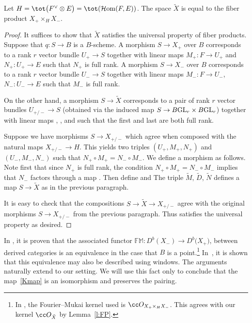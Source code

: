 \begin{Lemma}\label{l:FP} Let $H = \tot\bigl(F^\vee \otimes E\bigr) = \tot( \mathcal{H}{\rm om}(F, E) )$.
 The space $\tilde X$ is equal to the fiber product
 $X_+ \times_H X_-.$
\end{Lemma}
\begin{proof}
 It suffices to show that $\tilde X$ satisfies the universal property of fiber products. Suppose that $q\colon S \to B$ is a $B$-scheme. A morphism $S \to X_+$ over $B$ corresponds to a rank $r$ vector bundle $U_+ \to S$ together with linear maps $M_+\colon F \to U_+$ and $N_+\colon U_+ \to E$ such that $N_+$ is full rank. A morphism $S \to X_-$ over $B$ corresponds to a rank $r$ vector bundle $U_- \to S$ together with linear maps $M_-\colon F \to U_-$, $N_-\colon U_- \to E$ such that $M_-$ is full rank.

 On the other hand, a morphism $S \to \tilde X$ corresponds to a pair of rank $r$ vector bundles $U_{+/-} \to S$ (obtained via the induced map $S \to B{\rm GL}_r \times B{\rm GL}_r$) together with linear maps
 , , and  such that the first and last are both full rank.

 Suppose we have morphisms $S \to X_{+/-}$ which agree when composed with the natural maps $X_{+/-} \to H$.
 This yields two triples $(U_+, M_+, N_+)$ and $(U_-, M_-, N_-)$ such that $N_+ \circ M_+ = N_- \circ M_-$.
 We define a morphism  as follows.
 Note first that since $N_+$ is full rank, the condition $N_+ \circ M_+ = N_- \circ M_-$ implies that $N_-$ factors through a map . Then define  and  The triple $\tilde M$, $\tilde D$, $\tilde N$ defines a map $S \to \tilde X$ as in the previous paragraph.

It is easy to check that the compositions $S \to \tilde X \to X_{+/-}$ agree with the original morphisms $S \to X_{+/-}$ from the previous paragraph. Thus  satisfies the universal property as desired.
\end{proof}

In \cite[Theorem~D]{BLV}, it is proven that the
associated functor $\mathbb{FM}\colon D^b(X_-) \to D^b\bigl(X_+\bigr)$, between derived categories is an equivalence in the case that $B$ is a point.\footnote{In \cite{BLV}, the Fourier--Mukai kernel used is $\cc O_{X_+ \times_H X_-}$. This agrees with our kernel $\cc O_{\tilde X}$ by Lemma~\ref{l:FP}.} In~\cite{BCFMV}, it is shown that this equivalence may also be described using windows. The arguments naturally extend to our setting. We will use this fact only to conclude that the map~\eqref{Kmap} is an isomorphism and preserves the pairing.

